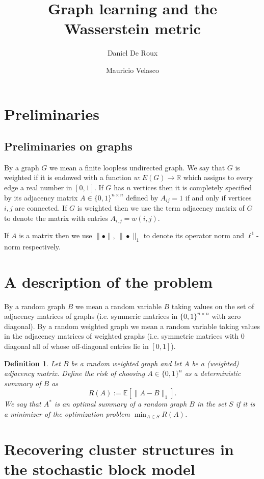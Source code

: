 \documentclass[12pt]{amsart}
\title{Graph learning and the Wasserstein metric}
\author{Daniel De Roux}
\author{Mauricio Velasco}
\newtheorem{definition}[lemma]{Definition}
\theoremstyle{remark}
\newcommand{\EE}{\mathbb{E}}
\newcommand{\RR}{\mathbb{R}}
\begin{document}
\maketitle


\section{Preliminaries}


\subsection{ Preliminaries on graphs}

By a graph $G$ we mean a finite loopless undirected graph. We say that $G$ is weighted if it is endowed with a function $w: E(G)\rightarrow \RR$ which assigns to every edge a real number in $[0,1]$. If $G$ has $n$ vertices then it is completely specified by its adjacency matrix $A\in \{0,1\}^{n\times n}$ defined by $A_{ij}=1$ if and only if vertices $i,j$ are connected. If $G$ is weighted then we use the term adjacency matrix of $G$ to denote the matrix with entries $A_{i,j}=w(i,j)$. 

If $A$ is a matrix then we use $\|\bullet\|$, $\|\bullet\|_1$ to denote its operator norm and $\ell^1$-norm respectively.

\section{A description of the problem}

By a random graph $B$ we mean a random variable $B$ taking values on the set of adjacency matrices of graphs (i.e. symmeric matrices in $\{0,1\}^{n\times n}$ with zero diagonal). By a random weighted graph we mean a random variable taking values in the adjacency matrices of weighted graphs (i.e. symmetric matrices with $0$ diagonal all of whose off-diagonal entries lie in $[0,1]$). 

\begin{definition} Let $B$ be a random weighted graph and let $A$ be a (weighted) adjacency matrix. Define the risk of choosing $A\in \{0,1\}^n$ as a deterministic summary of $B$ as
\[R(A):=\EE[\|A-B\|_1].\]
We say that $A^*$ is an optimal summary of a random graph $B$ in the set $S$ if it is a minimizer of the optimization problem $\min_{A\in S} R(A)$.
\end{definition}


\section{Recovering cluster structures in the stochastic block model}
\end{document}
